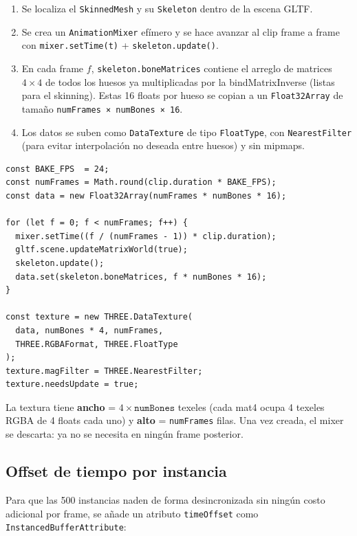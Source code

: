 \documentclass[12pt,a4paper]{article}
\begin{document}
\begin{enumerate}[leftmargin=*]
  \item Se localiza el \texttt{SkinnedMesh} y su \texttt{Skeleton} dentro de la escena GLTF.
  \item Se crea un \texttt{AnimationMixer} efímero y se hace avanzar al clip frame a frame
        con \texttt{mixer.setTime(t)} + \texttt{skeleton.update()}.
  \item En cada frame $f$, \texttt{skeleton.boneMatrices} contiene el arreglo de matrices
        $4\times4$ de todos los huesos ya multiplicadas por la bindMatrixInverse
        (listas para el skinning). Estas 16 floats por hueso se copian a un
        \texttt{Float32Array} de tamaño \texttt{numFrames × numBones × 16}.
  \item Los datos se suben como \texttt{DataTexture} de tipo \texttt{FloatType},
        con \texttt{NearestFilter} (para evitar interpolación no deseada entre huesos)
        y sin mipmaps.
\end{enumerate}

\begin{lstlisting}[style=glsl, language={}]
const BAKE_FPS  = 24;
const numFrames = Math.round(clip.duration * BAKE_FPS);
const data = new Float32Array(numFrames * numBones * 16);

for (let f = 0; f < numFrames; f++) {
  mixer.setTime((f / (numFrames - 1)) * clip.duration);
  gltf.scene.updateMatrixWorld(true);
  skeleton.update();
  data.set(skeleton.boneMatrices, f * numBones * 16);
}

const texture = new THREE.DataTexture(
  data, numBones * 4, numFrames,
  THREE.RGBAFormat, THREE.FloatType
);
texture.magFilter = THREE.NearestFilter;
texture.needsUpdate = true;
\end{lstlisting}

La textura tiene \textbf{ancho} = $4 \times \texttt{numBones}$ texeles
(cada mat4 ocupa 4 texeles RGBA de 4 floats cada uno) y
\textbf{alto} = \texttt{numFrames} filas. Una vez creada, el mixer se descarta:
ya no se necesita en ningún frame posterior.

\subsection{Offset de tiempo por instancia}

Para que las 500 instancias naden de forma desincronizada sin ningún costo adicional
por frame, se añade un atributo \texttt{timeOffset} como
\texttt{InstancedBufferAttribute}:
\end{document}
